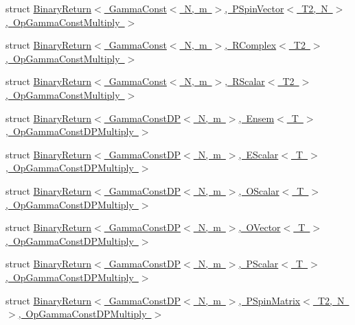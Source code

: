 \begin{DoxyCompactItemize}
\item 
struct \mbox{\hyperlink{structENSEM_1_1BinaryReturn_3_01GammaConst_3_01N_00_01m_01_4_00_01PSpinVector_3_01T2_00_01N_01_4_00_01OpGammaConstMultiply_01_4}{Binary\+Return$<$ Gamma\+Const$<$ N, m $>$, P\+Spin\+Vector$<$ T2, N $>$, Op\+Gamma\+Const\+Multiply $>$}}
\item 
struct \mbox{\hyperlink{structENSEM_1_1BinaryReturn_3_01GammaConst_3_01N_00_01m_01_4_00_01RComplex_3_01T2_01_4_00_01OpGammaConstMultiply_01_4}{Binary\+Return$<$ Gamma\+Const$<$ N, m $>$, R\+Complex$<$ T2 $>$, Op\+Gamma\+Const\+Multiply $>$}}
\item 
struct \mbox{\hyperlink{structENSEM_1_1BinaryReturn_3_01GammaConst_3_01N_00_01m_01_4_00_01RScalar_3_01T2_01_4_00_01OpGammaConstMultiply_01_4}{Binary\+Return$<$ Gamma\+Const$<$ N, m $>$, R\+Scalar$<$ T2 $>$, Op\+Gamma\+Const\+Multiply $>$}}
\item 
struct \mbox{\hyperlink{structENSEM_1_1BinaryReturn_3_01GammaConstDP_3_01N_00_01m_01_4_00_01Ensem_3_01T_01_4_00_01OpGammaConstDPMultiply_01_4}{Binary\+Return$<$ Gamma\+Const\+D\+P$<$ N, m $>$, Ensem$<$ T $>$, Op\+Gamma\+Const\+D\+P\+Multiply $>$}}
\item 
struct \mbox{\hyperlink{structENSEM_1_1BinaryReturn_3_01GammaConstDP_3_01N_00_01m_01_4_00_01EScalar_3_01T_01_4_00_01OpGammaConstDPMultiply_01_4}{Binary\+Return$<$ Gamma\+Const\+D\+P$<$ N, m $>$, E\+Scalar$<$ T $>$, Op\+Gamma\+Const\+D\+P\+Multiply $>$}}
\item 
struct \mbox{\hyperlink{structENSEM_1_1BinaryReturn_3_01GammaConstDP_3_01N_00_01m_01_4_00_01OScalar_3_01T_01_4_00_01OpGammaConstDPMultiply_01_4}{Binary\+Return$<$ Gamma\+Const\+D\+P$<$ N, m $>$, O\+Scalar$<$ T $>$, Op\+Gamma\+Const\+D\+P\+Multiply $>$}}
\item 
struct \mbox{\hyperlink{structENSEM_1_1BinaryReturn_3_01GammaConstDP_3_01N_00_01m_01_4_00_01OVector_3_01T_01_4_00_01OpGammaConstDPMultiply_01_4}{Binary\+Return$<$ Gamma\+Const\+D\+P$<$ N, m $>$, O\+Vector$<$ T $>$, Op\+Gamma\+Const\+D\+P\+Multiply $>$}}
\item 
struct \mbox{\hyperlink{structENSEM_1_1BinaryReturn_3_01GammaConstDP_3_01N_00_01m_01_4_00_01PScalar_3_01T_01_4_00_01OpGammaConstDPMultiply_01_4}{Binary\+Return$<$ Gamma\+Const\+D\+P$<$ N, m $>$, P\+Scalar$<$ T $>$, Op\+Gamma\+Const\+D\+P\+Multiply $>$}}
\item 
struct \mbox{\hyperlink{structENSEM_1_1BinaryReturn_3_01GammaConstDP_3_01N_00_01m_01_4_00_01PSpinMatrix_3_01T2_00_01N_01fb4087ee38fd52097a0becc587302e6f}{Binary\+Return$<$ Gamma\+Const\+D\+P$<$ N, m $>$, P\+Spin\+Matrix$<$ T2, N $>$, Op\+Gamma\+Const\+D\+P\+Multiply $>$}}

\end{DoxyCompactItemize}

